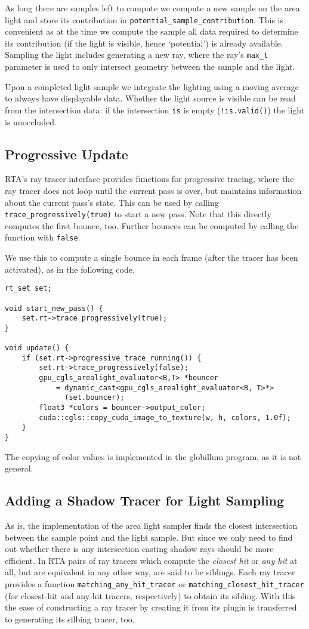\documentclass[a4paper,11pt]{scrartcl}
\begin{document}
As long there are samples left to compute we compute a new sample on the area light and store its contribution in 
	\lstinline|potential_sample_contribution|.
This is convenient as at the time we compute the sample all data required to determine its contribution (if the light is visible, hence `potential')
	is already available.
Sampling the light includes generating a new ray, 
	where the ray's \lstinline|max_t| parameter is used to only intersect geometry between the sample and the light.

Upon a completed light sample we integrate the lighting using a moving average to always have displayable data.
Whether the light source is visible can be read from the intersection data: if the intersection \lstinline|is| is empty (\lstinline|!is.valid()|)
	the light is unoccluded.

\subsection{Progressive Update}
RTA's ray tracer interface provides functions for progressive tracing, where the ray tracer does not loop until the current pass is over,
	but maintains information about the current pass's state.
This can be used by calling \lstinline|trace_progressively(true)| to start a new pass.
Note that this directly computes the first bounce, too.
Further bounces can be computed by calling the function with \lstinline|false|.

We use this to compute a single bounce in each frame (after the tracer has been activated), as in the following code.
\begin{lstlisting}
rt_set set;

void start_new_pass() {
	set.rt->trace_progressively(true);
}
	
void update() {
	if (set.rt->progressive_trace_running()) {
		set.rt->trace_progressively(false);
		gpu_cgls_arealight_evaluator<B,T> *bouncer 
			= dynamic_cast<gpu_cgls_arealight_evaluator<B, T>*>
			  (set.bouncer);
		float3 *colors = bouncer->output_color;
		cuda::cgls::copy_cuda_image_to_texture(w, h, colors, 1.0f);
	}
}
\end{lstlisting}
The copying of color values is implemented in the globillum program, as it is not general.

\subsection{Adding a Shadow Tracer for Light Sampling}
As is, the implementation of the area light sampler finds the closest intersection between the sample point and the light sample.
But since we only need to find out whether there is any intersection casting shadow rays should be more efficient.
In RTA pairs of ray tracers which compute the \emph{closest hit} or \emph{any hit} at all, but are equivalent in any other way, are said to be siblings.
Each ray tracer provides a function \lstinline|matching_any_hit_tracer| or \lstinline|matching_closest_hit_tracer| 
	(for closest-hit and any-hit tracers, respectively) to obtain its sibling.
With this the ease of constructing a ray tracer by creating it from its plugin is transferred to generating its silbing tracer, too.
\end{document}
